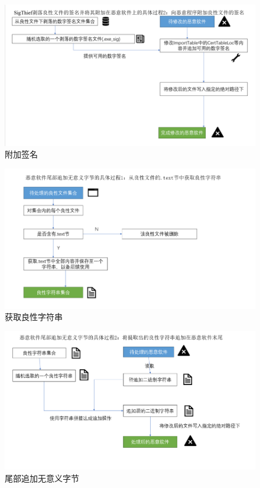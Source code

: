 \begin{figure}
  \centering
  \includegraphics[]{images/append_signature.png}
  \caption{附加签名}\label{fig:append_signature}
\end{figure}

\begin{figure}
  \centering
  \includegraphics[]{images/get_benign_strings.png}
  \caption{获取良性字符串}\label{fig:get_benign_strings}
\end{figure}

\begin{figure}
  \centering
  \includegraphics[]{images/append_strings.png}
  \caption{尾部追加无意义字节}\label{fig:append_strings}
\end{figure}

